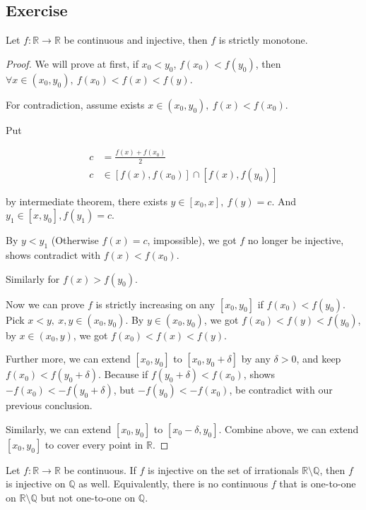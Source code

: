 \subsection{Exercise}

\begin{exercise}
    Let $f: \mathbb{R} \to \mathbb{R}$ be continuous and injective, then $f$ is strictly monotone.
\end{exercise}

\begin{proof}
    We will prove at first, if $x_0 < y_0$, $f(x_0) < f(y_0)$, then $\forall x \in (x_0, y_0),\: f(x_0) < f(x) < f(y)$.

    For contradiction, assume exists $x \in (x_0, y_0),\: f(x) < f(x_0)$.

    Put

    \begin{align*}
        c &= \frac{f(x) + f(x_0)}{2} \\
        c & \in [f(x), f(x_0)] \cap [f(x), f(y_0)] 
    \end{align*}

    by intermediate theorem, there exists $y \in [x_0, x],\: f(y) = c$.
    And $y_1 \in [x,y_0], f(y_1) = c$.

    By $y < y_1$ (Otherwise $f(x) = c$, impossible), we got $f$ no longer be injective, shows 
    contradict with $f(x) < f(x_0)$.

    Similarly for $f(x) > f(y_0)$.

    Now we can prove $f$ is strictly increasing on any $[x_0, y_0]$ if $f(x_0) < f(y_0)$. Pick $x <y,\: x,y \in (x_0, y_0)$. By $y \in (x_0, y_0)$,
    we got $f(x_0) < f(y) < f(y_0)$, by $x \in (x_0, y)$, we got $f(x_0) < f(x) < f(y)$.

    Further more, we can extend $[x_0, y_0]$ to $[x_0, y_0 + \delta]$ by any $\delta > 0$,
    and keep $f(x_0) < f(y_0 + \delta)$. Because if $f(y_0 + \delta) < f(x_0)$, 
    shows $-f(x_0) < - f(y_0 + \delta)$, but $-f(y_0) < -f(x_0)$, be contradict with our previous conclusion. 

    Similarly, we can extend $[x_0, y_0]$ to $[x_0 - \delta, y_0]$. Combine above, we can extend $[x_0, y_0]$
    to cover every point in $\mathbb{R}$.


\end{proof}

\begin{exercise}
Let $f:\mathbb{R}\to\mathbb{R}$ be continuous. If $f$ is injective on the set
of irrationals $\mathbb{R}\setminus\mathbb{Q}$, then $f$ is injective on $\mathbb{Q}$ as well.
Equivalently, there is no continuous $f$ that is one-to-one on $\mathbb{R}\setminus\mathbb{Q}$
but not one-to-one on $\mathbb{Q}$.
\end{exercise}

